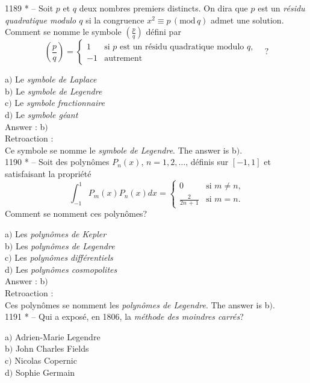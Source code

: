 ﻿\documentclass[letterpaper, 12pt]{article}
\begin{document}
1189 * -- Soit $p$ et $q$ deux nombres premiers distincts.
On dira que  $p$ est un {\sl r\'esidu quadratique modulo $q$} si la
congruence $x^2\equiv p\,(\mathrm{mod}\,q)$
admet une solution.
Comment se nomme le symbole $(\frac pq)$ d\'efini par
$$\displaystyle{\left(\frac pq\right)=\begin{cases}
1&\text{si $p$ est un r\'esidu quadratique modulo $q$,}\\[3mm]
-1&\text{autrement}
\end{cases}}\quad?$$

a$)$ Le {\sl symbole de Laplace} \\
b$)$ Le {\sl symbole de Legendre} \\
c$)$ Le {\sl symbole fractionnaire} \\
d$)$ Le {\sl symbole g\'eant}\\

Answer : b$)$\\

Retroaction : \\
Ce symbole se nomme le {\sl symbole de Legendre}.
The answer is b$)$.\\

1190 * -- Soit des polyn\^omes $P_n(x)$, $n=1,2,\ldots$, d\'efinis sur
$[-1,1]$ et satisfaisant la propri\'et\'e
$$\displaystyle{\int_{-1}^1P_m(x)P_n(x)dx=}\begin{cases}
0&\text{si $m\not=n$,}\\[3mm]
\frac2{2n\,+\,1}&\text{si $m=n$.}
\end{cases}$$
Comment se nomment ces polyn\^omes?

a$)$ Les {\sl polyn\^omes de Kepler} \\
b$)$ Les {\sl polyn\^omes de Legendre} \\
c$)$ Les {\sl polyn\^omes diff\'erentiels} \\
d$)$ Les {\sl polyn\^omes cosmopolites}\\

Answer : b$)$\\

Retroaction : \\
Ces polyn\^omes se nomment les {\sl polyn\^omes de Legendre}.
The answer is b$)$.\\

1191 * -- Qui a expos\'e, en 1806, la {\sl m\'ethode des moindres
carr\'es}?

a$)$ Adrien-Marie Legendre \\
b$)$ John Charles Fields \\
c$)$ Nicolas Copernic \\
d$)$ Sophie Germain\\
\end{document}

